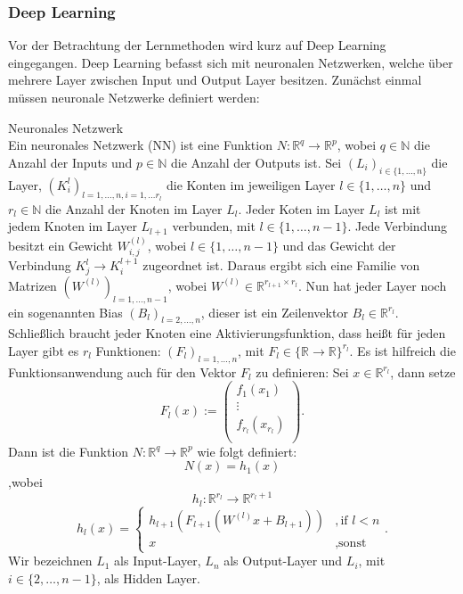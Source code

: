 \documentclass[12pt,letterpaper,ngerman]{article}
\begin{document}
\subsubsection{Deep Learning}
Vor der Betrachtung der Lernmethoden wird kurz auf Deep Learning eingegangen.
Deep Learning befasst sich mit neuronalen Netzwerken, welche über
mehrere Layer zwischen Input und Output Layer besitzen.  
Zunächst einmal müssen neuronale Netzwerke definiert werden:
\begin{definition}{Neuronales Netzwerk}
  \\
  Ein neuronales Netzwerk (NN) ist eine Funktion $N: \mathbb{R}^q \to \mathbb{R}^p$,
  wobei $q\in \mathbb{N}$ die Anzahl der Inputs und $p \in \mathbb{N}$ die
  Anzahl der Outputs ist. Sei $(L_i)_{i \in \{ 1, \dots, n\}}$ die Layer,
  $(K_i^l)_{l=1,\dots, n, i = 1,\dots r_l}$ die Konten im jeweiligen Layer 
  $l \in \{1, \dots, n\}$ und $r_l \in \mathbb{N}$ die Anzahl der Knoten im
  Layer $L_l$. Jeder Koten im Layer $L_l$ ist mit jedem Knoten im 
  Layer $L_{l+1}$ verbunden, mit $l \in \{1,\dots, n-1\}$. Jede Verbindung
  besitzt ein Gewicht $W_{i,j}^{(l)}$, wobei $l \in \{1,\dots, n-1\}$ und 
  das Gewicht der Verbindung $K^l_j \to K^{l+1}_i$ zugeordnet ist.
  Daraus ergibt sich eine Familie von Matrizen 
  $(W^{(l)})_{l=1,\dots, n-1}$, wobei 
  $ W^{(l)}\in \mathbb{R}^{r_{l+1}\times r_{l}}$.
  Nun hat jeder Layer noch ein sogenannten Bias $(B_l)_{l = 2,\dots,n}$,
  dieser ist ein Zeilenvektor $B_l \in \mathbb{R}^{r_l}$.
  Schließlich braucht jeder Knoten eine Aktivierungsfunktion, dass heißt
  für jeden Layer gibt es $r_l$ Funktionen:
  $(F_l)_{l=1,\dots,n}$, mit $F_l \in \{\mathbb{R} \to \mathbb{R}\}^{r_l}$.
  Es ist hilfreich die Funktionsanwendung auch für den Vektor $F_l$ zu definieren:
  Sei $x \in \mathbb{R}^{r_l}$, dann setze
  \[
    F_l(x) := \begin{pmatrix} 
        f_1(x_1) \\
        \vdots\\
        f_{r_l}(x_{r_l})\\
    \end{pmatrix}.
  \]
  Dann ist die Funktion $N: \mathbb{R}^q \to \mathbb{R}^p$ wie folgt definiert:
  \[
    N(x) = h_1(x)
  \]
  ,wobei
  \[h_l: \mathbb{R}^{r_l} \to \mathbb{R}^{r_l+1}\]
  \[
    h_l(x) = 
      \begin{cases}
        h_{l+1}(F_{l+1}(W^{(l)}x + B_{l+1}))& ,  \text{if } l < n  \\
        x & , \text{sonst}
      \end{cases}.
  \]
  Wir bezeichnen $L_1$ als Input-Layer, $L_n$ als Output-Layer und
  $L_i$, mit $i \in \{2, \dots, n-1\}$, als Hidden Layer.
\end{definition}
\end{document}
